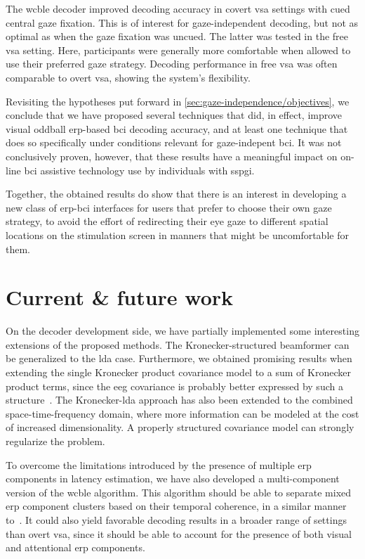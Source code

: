 The \ac{wcble} decoder improved decoding accuracy in covert
\ac{vsa} settings with cued central gaze fixation.
This is of interest for gaze-independent decoding, but not as optimal as when the
gaze fixation was uncued.
The latter was tested in the free \ac{vsa} setting.
Here, participants were generally more comfortable when allowed to use their
preferred gaze strategy.
Decoding performance in free \ac{vsa} was often comparable to overt \ac{vsa},
showing the system's flexibility.

Revisiting the hypotheses put forward in
\cref{sec:gaze-independence/objectives}, we conclude that we have proposed
several techniques that did, in effect, improve visual oddball \ac{erp}-based
\ac{bci} decoding accuracy, and at least one technique that does so specifically
under conditions relevant for gaze-indepent \ac{bci}.
It was not conclusively proven, however, that these results have a meaningful
impact on on-line \ac{bci} assistive technology use by individuals with
\ac{sspgi}.

Together, the obtained results do show that there is an interest in developing
a new class of \ac{erp}-\ac{bci} interfaces for users that prefer to choose their own gaze strategy, to
avoid the effort of redirecting their eye gaze to different spatial locations
on the stimulation screen in manners that might be uncomfortable for them.

\section{Current \& future work}
On the decoder development side, we have partially implemented some interesting
extensions of the proposed methods.
The Kronecker-structured beamformer can be generalized to the \ac{lda} case.
Furthermore, we obtained promising results when extending the single
Kronecker product covariance model to a sum of Kronecker product terms, since
the \ac{eeg} covariance is probably better expressed by such a
structure~\cite{Bijma2005}.
The Kronecker-\ac{lda} approach has also been extended to the combined
space-time-frequency domain, where more information can be modeled at the cost
of increased dimensionality.
A properly structured covariance model can strongly regularize the problem.

To overcome the limitations introduced by the presence of multiple \ac{erp}
components in latency estimation, we have also developed a multi-component
version of the \ac{wcble} algorithm.
This algorithm should be able to separate mixed \ac{erp} component clusters
based on their temporal coherence, in a similar manner to~\textcite{Ouyang2017}.
It could also yield favorable decoding results in a broader range of settings
than overt \ac{vsa}, since it should be able to account for the presence of both
visual and attentional \ac{erp} components.

